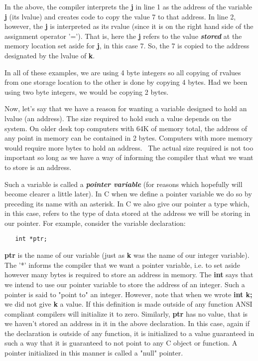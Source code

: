 In the above, the compiler interprets the \textbf{j} in line 1 as the
address of the variable \textbf{j} (its lvalue) and creates code to copy
the value 7 to that address. In line 2, however, the \textbf{j} is
interpreted as its rvalue (since it is on the right hand side of the
assignment operator '='). That is, here the \textbf{j} refers to the
value \emph{\textbf{stored}} at the memory location set aside for
\textbf{j}, in this case 7. So, the 7 is copied to the address
designated by the lvalue of \textbf{k}.

In all of these examples, we are using 4 byte integers so all copying of
rvalues from one storage location to the other is done by copying 4
bytes. Had we been using two byte integers, we would be copying 2 bytes.

Now, let's say that we have a reason for wanting a variable designed to
hold an lvalue (an address). The size required to hold such a value
depends on the system. On older desk top computers with 64K of memory
total, the address of any point in memory can be contained in 2 bytes.
Computers with more memory would require more bytes to hold an address.~
The actual size required is not too important so long as we have a way
of informing the compiler that what we want to store is an address.

Such a variable is called a \emph{\textbf{pointer variable}} (for
reasons which hopefully will become clearer a little later). In C when
we define a pointer variable we do so by preceding its name with an
asterisk. In C we also give our pointer a type which, in this case,
refers to the type of data stored at the address we will be storing in
our pointer. For example, consider the variable declaration:

\begin{verbatim}
   int *ptr;
\end{verbatim}

\textbf{ptr} is the name of our variable (just as \textbf{k} was the
name of our integer variable). The '*' informs the compiler that we want
a pointer variable, i.e. to set aside however many bytes is required to
store an address in memory. The \textbf{int} says that we intend to use
our pointer variable to store the address of an integer. Such a pointer
is said to "point to" an integer. However, note that when we wrote
\textbf{int k;} we did not give \textbf{k} a value. If this definition
is made outside of any function ANSI compliant compilers will initialize
it to zero. Similarly, \textbf{ptr} has no value, that is we haven't
stored an address in it in the above declaration. In this case, again if
the declaration is outside of any function, it is initialized to a value
guaranteed in such a way that it is guaranteed to not point to any C
object or function. A pointer initialized in this manner is called a
"null" pointer.

